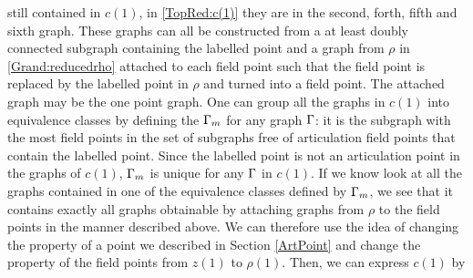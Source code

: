 \documentclass[8.5pt,twoside,twocolumn]{article}
\theoremstyle{standard}
\begin{document}
still contained in $c(1)$, in \eqref{TopRed:c(1)} they are in the second, forth, fifth and sixth
graph. These graphs can all be constructed from a at least doubly connected subgraph containing the labelled point and
a graph from $\rho$ in \eqref{Grand:reducedrho} attached to each field point such that the field
point is replaced by the labelled point in $\rho$ and turned into a field point. The attached graph may
be the one point graph. One can group all the graphs in $c(1)$ into equivalence classes by defining
the  $\Gamma_m$ for any graph $\Gamma$: it is the subgraph with the most field points
in the set of subgraphs free of articulation field points that contain the labelled point. Since the labelled
point is not an articulation point in the graphs of $c(1)$, $\Gamma_m$ is unique for any $\Gamma$ in $c(1)$. If
we know look at all the graphs contained in one of the equivalence classes defined by $\Gamma_m$, we see
that it contains exactly all graphs obtainable by attaching graphs from $\rho$ to the field points
in the manner described above. We can therefore use the idea of changing the property of a point
we described in Section \ref{ArtPoint} and change the property of the field points from $z(1)$
to $\rho(1)$. Then, we can express $c(1)$ by
\end{document}
